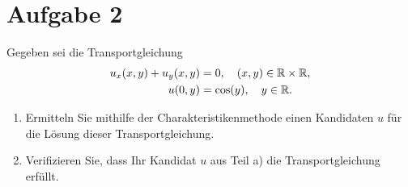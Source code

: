 \documentclass{exercise}
\begin{document}
    \section*{Aufgabe 2}

    \begin{problem}
        Gegeben sei die Transportgleichung
        \begin{align*}
            u_x\parentheses*{x, y} + u_y\parentheses*{x, y} &= 0, \quad \parentheses*{x, y} \in \R \times \R,\\
            u\parentheses*{0, y} &= \cos\parentheses*{y}, \quad y \in \R.
        \end{align*}
        \begin{enumerate}
            \item Ermitteln Sie mithilfe der Charakteristikenmethode einen Kandidaten \(u\) für die Lösung dieser Transportgleichung.
            \item Verifizieren Sie, dass Ihr Kandidat \(u\) aus Teil a) die Transportgleichung erfüllt.
        \end{enumerate}
    \end{problem}
\end{document}
